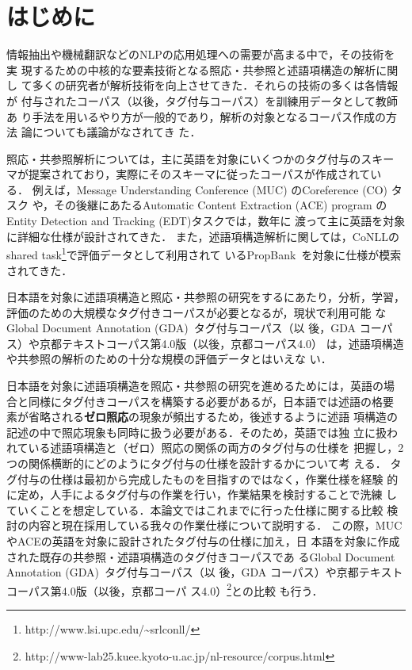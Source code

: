 \documentclass[japanese]{jnlp_1.4}
\begin{document}
\maketitle




\section{はじめに}
\label{sec:first}

情報抽出や機械翻訳などのNLPの応用処理への需要が高まる中で，その技術を実
現するための中核的な要素技術となる照応・共参照と述語項構造の解析に関し
て多くの研究者が解析技術を向上させてきた．それらの技術の多くは各情報が
付与されたコーパス（以後，タグ付与コーパス）を訓練用データとして教師あ
り手法を用いるやり方が一般的であり，解析の対象となるコーパス作成の方法
論についても議論がなされてき
た\cite{Hirschman:97,Kingsbury:02,Doddington:04}．

照応・共参照解析については，主に英語を対象にいくつかのタグ付与のスキー
マが提案されており，実際にそのスキーマに従ったコーパスが作成されてい
る\cite{Hirschman:97,Kawahara:02,Hasida:05,Poesio:04,Doddington:04}．
例えば，Message Understanding Conference (MUC) のCoreference (CO) タスク
\cite{Hirschman:97}や，その後継にあたるAutomatic Content Extraction
(ACE) program のEntity Detection and Tracking (EDT)タスクでは，数年に
渡って主に英語を対象に詳細な仕様が設計されてきた．
また，述語項構造解析に関しては，CoNLLのshared task\footnote{
    http://www.lsi.upc.edu/\~{}srlconll/}で評価データとして利用されて
いるPropBank~\cite{Palmer:05}を対象に仕様が模索されてきた．

日本語を対象に述語項構造と照応・共参照の研究をするにあたり，分析，学習，
評価のための大規模なタグ付きコーパスが必要となるが，現状で利用可能
なGlobal Document Annotation (GDA)~\cite{Hasida:05}タグ付与コーパス（以
後，GDA コーパス）や京都テキストコーパス第4.0版（以後，京都コーパス4.0）
は，述語項構造や共参照の解析のための十分な規模の評価データとはいえな
い．

日本語を対象に述語項構造を照応・共参照の研究を進めるためには，英語の場
合と同様にタグ付きコーパスを構築する必要があるが，日本語では述語の格要
素が省略される\textbf{ゼロ照応}の現象が頻出するため，後述するように述語
項構造の記述の中で照応現象も同時に扱う必要がある．そのため，英語では独
立に扱われている述語項構造と（ゼロ）照応の関係の両方のタグ付与の仕様を
把握し，2つの関係横断的にどのようにタグ付与の仕様を設計するかについて考
える．
タグ付与の仕様は最初から完成したものを目指すのではなく，作業仕様を経験
的に定め，人手によるタグ付与の作業を行い，作業結果を検討することで洗練
していくことを想定している．本論文ではこれまでに行った仕様に関する比較
検討の内容と現在採用している我々の作業仕様について説明する．
この際，MUCやACEの英語を対象に設計されたタグ付与の仕様に加え，日
本語を対象に作成された既存の共参照・述語項構造のタグ付きコーパスであ
るGlobal Document Annotation (GDA)~\cite{Hasida:05}タグ付与コーパス（以
後，GDA コーパス）や京都テキストコーパス第4.0版（以後，京都コーパ
ス4.0）\footnote{
	http://www-lab25.kuee.kyoto-u.ac.jp/nl-resource/corpus.html}との比較
も行う．
\end{document}
